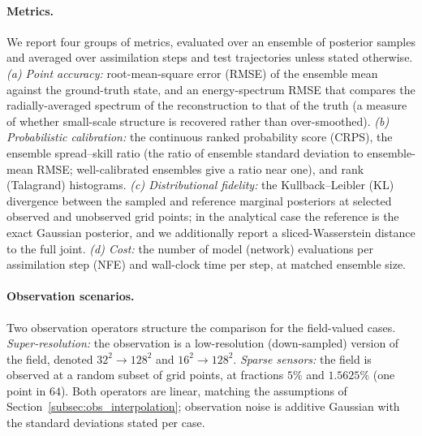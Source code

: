 \paragraph{Metrics.}
We report four groups of metrics, evaluated over an ensemble of posterior samples and averaged over assimilation steps and test trajectories unless stated otherwise.
\emph{(a) Point accuracy:} root-mean-square error (RMSE) of the ensemble mean against the ground-truth state, and an energy-spectrum RMSE that compares the radially-averaged spectrum of the reconstruction to that of the truth (a measure of whether small-scale structure is recovered rather than over-smoothed).
\emph{(b) Probabilistic calibration:} the continuous ranked probability score (CRPS), the ensemble spread--skill ratio (the ratio of ensemble standard deviation to ensemble-mean RMSE; well-calibrated ensembles give a ratio near one), and rank (Talagrand) histograms.
\emph{(c) Distributional fidelity:} the Kullback--Leibler (KL) divergence between the sampled and reference marginal posteriors at selected observed and unobserved grid points; in the analytical case the reference is the exact Gaussian posterior, and we additionally report a sliced-Wasserstein distance to the full joint.
\emph{(d) Cost:} the number of model (network) evaluations per assimilation step (NFE) and wall-clock time per step, at matched ensemble size.

\paragraph{Observation scenarios.}
Two observation operators structure the comparison for the field-valued cases. \emph{Super-resolution:} the observation is a low-resolution (down-sampled) version of the field, denoted $32^2\!\to\!128^2$ and $16^2\!\to\!128^2$. \emph{Sparse sensors:} the field is observed at a random subset of grid points, at fractions $5\%$ and $1.5625\%$ (one point in $64$). Both operators are linear, matching the assumptions of Section~\ref{subsec:obs_interpolation}; observation noise is additive Gaussian with the standard deviations stated per case.

